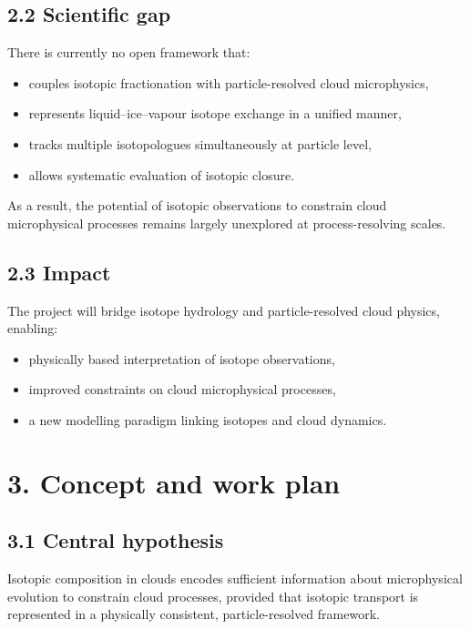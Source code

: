 \documentclass[11pt,a4paper]{article}
\begin{document}
\subsection*{2.2 Scientific gap}
There is currently no open framework that:

\begin{itemize}
\item couples isotopic fractionation with particle-resolved cloud microphysics,


\item represents liquid–ice–vapour isotope exchange in a unified manner,


\item tracks multiple isotopologues simultaneously at particle level,


\item allows systematic evaluation of isotopic closure.


\end{itemize}
As a result, the potential of isotopic observations to constrain cloud microphysical processes remains largely unexplored at process-resolving scales.

\subsection*{2.3 Impact}
The project will bridge isotope hydrology and particle-resolved cloud physics, enabling:

\begin{itemize}
\item physically based interpretation of isotope observations,


\item improved constraints on cloud microphysical processes,


\item a new modelling paradigm linking isotopes and cloud dynamics.


\end{itemize}
\section*{3. Concept and work plan}
\subsection*{3.1 Central hypothesis}
Isotopic composition in clouds encodes sufficient information about microphysical evolution to constrain cloud processes, provided that isotopic transport is represented in a physically consistent, particle-resolved framework.
\end{document}
